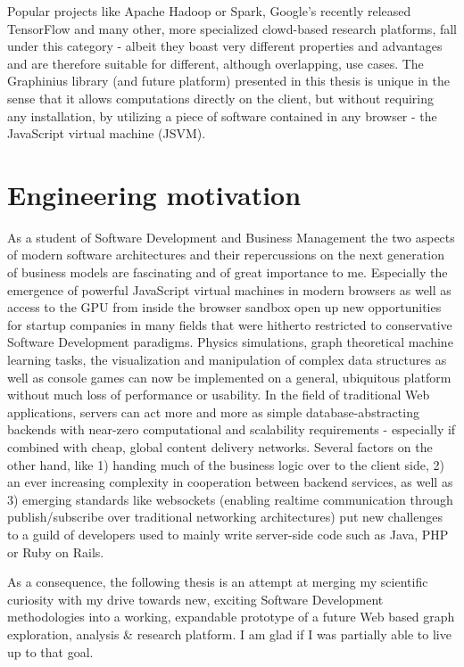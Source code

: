 Popular projects like Apache Hadoop or Spark, Google's recently released TensorFlow and many other, more specialized clowd-based research platforms, fall under this category - albeit they boast very different properties and advantages and are therefore suitable for different, although overlapping, use cases. The Graphinius library (and future platform) presented in this thesis is unique in the sense that it allows computations directly on the client, but without requiring any installation, by utilizing a piece of software contained in any browser - the JavaScript virtual machine (JSVM). 


\section{Engineering motivation}
\label{sect:engineering_motivation}

As a student of Software Development and Business Management the two aspects of modern software architectures and their repercussions on the next generation of business models are fascinating and of great importance to me. Especially the emergence of powerful JavaScript virtual machines in modern browsers as well as access to the GPU from inside the browser sandbox open up new opportunities for startup companies in many fields that were hitherto restricted to conservative Software Development paradigms. Physics simulations, graph theoretical machine learning tasks, the visualization and manipulation of complex data structures as well as console games can now be implemented on a general, ubiquitous platform without much loss of performance or usability. In the field of traditional Web applications, servers can act more and more as simple database-abstracting backends with near-zero computational and scalability requirements - especially if combined with cheap, global content delivery networks. Several factors on the other hand, like 1) handing much of the business logic over to the client side, 2) an ever increasing complexity in cooperation between backend services, as well as 3) emerging standards like websockets (enabling realtime communication through publish/subscribe over traditional networking architectures) put new challenges to a guild of developers used to mainly write server-side code such as Java, PHP or Ruby on Rails.

As a consequence, the following thesis is an attempt at merging my scientific curiosity with my drive towards new, exciting Software Development methodologies into a working, expandable prototype of a future Web based graph exploration, analysis \& research platform. I am glad if I was partially able to live up to that goal.


